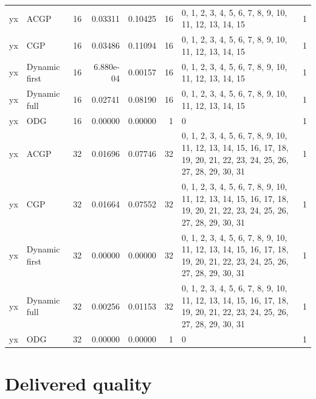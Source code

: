 \documentclass[10pt,a4paper]{article}
\begin{document}
\begin{longtable}{@{}p{23mm}p{29mm}rrrrp{36mm}r@{}}
yx & ACGP & 16 & 0.03311 & 0.10425 & 16 & 0, 1, 2, 3, 4, 5, 6, 7, 8, 9, 10, 11, 12, 13, 14, 15 & 1 \\
yx & CGP & 16 & 0.03486 & 0.11094 & 16 & 0, 1, 2, 3, 4, 5, 6, 7, 8, 9, 10, 11, 12, 13, 14, 15 & 1 \\
yx & Dynamic first & 16 & 6.880e-04 & 0.00157 & 16 & 0, 1, 2, 3, 4, 5, 6, 7, 8, 9, 10, 11, 12, 13, 14, 15 & 1 \\
yx & Dynamic full & 16 & 0.02741 & 0.08190 & 16 & 0, 1, 2, 3, 4, 5, 6, 7, 8, 9, 10, 11, 12, 13, 14, 15 & 1 \\
yx & ODG & 16 & 0.00000 & 0.00000 & 1 & 0 & 1 \\
yx & ACGP & 32 & 0.01696 & 0.07746 & 32 & 0, 1, 2, 3, 4, 5, 6, 7, 8, 9, 10, 11, 12, 13, 14, 15, 16, 17, 18, 19, 20, 21, 22, 23, 24, 25, 26, 27, 28, 29, 30, 31 & 1 \\
yx & CGP & 32 & 0.01664 & 0.07552 & 32 & 0, 1, 2, 3, 4, 5, 6, 7, 8, 9, 10, 11, 12, 13, 14, 15, 16, 17, 18, 19, 20, 21, 22, 23, 24, 25, 26, 27, 28, 29, 30, 31 & 1 \\
yx & Dynamic first & 32 & 0.00000 & 0.00000 & 32 & 0, 1, 2, 3, 4, 5, 6, 7, 8, 9, 10, 11, 12, 13, 14, 15, 16, 17, 18, 19, 20, 21, 22, 23, 24, 25, 26, 27, 28, 29, 30, 31 & 1 \\
yx & Dynamic full & 32 & 0.00256 & 0.01153 & 32 & 0, 1, 2, 3, 4, 5, 6, 7, 8, 9, 10, 11, 12, 13, 14, 15, 16, 17, 18, 19, 20, 21, 22, 23, 24, 25, 26, 27, 28, 29, 30, 31 & 1 \\
yx & ODG & 32 & 0.00000 & 0.00000 & 1 & 0 & 1 \\
\end{longtable}\normalsize\setlength{\tabcolsep}{6pt}
\clearpage
\section*{Delivered quality}
\clearpage
\end{document}
